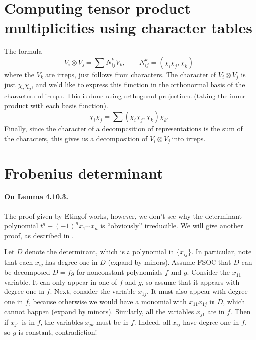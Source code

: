 \documentclass[oneside]{scrbook}
\begin{document}
\section{Computing tensor product multiplicities using character tables}
The formula
\[V_i\otimes V_j=\sum N_{ij}^kV_k, \qquad N_{ij}^{k}=(\chi_i\chi_j,\chi_k)\]
where the $V_k$ are irreps, just follows from characters. The character of $V_i\otimes V_j$ is just $\chi_i\chi_j$, and we'd like to express this function in the orthonormal basis of the characters of irreps. This is done using orthogonal projections (taking the inner product with each basis function). 
\[\chi_i\chi_j=\sum (\chi_i\chi_j,\chi_k)\chi_k.\]
Finally, since the character of a decomposition of representations is the sum of the characters, this gives us a decomposition of $V_i\otimes V_j$ into irreps.

\section{Frobenius determinant}
\paragraph{On Lemma 4.10.3.} 
The proof given by Etingof works, however, we don't see why the determinant polynomial $t^n-(-1)^nx_1\cdots x_n$ is ``obviously'' irreducible. We will give another proof, as described in \cite{147085}.

Let $D$ denote the determinant, which is a polynomial in $\{x_{ij}\}$. In particular, note that each $x_{ij}$ has degree one in $D$ (expand by minors). Assume FSOC that $D$ can be decomposed $D=fg$ for nonconstant polynomials $f$ and $g$. Consider the $x_{11}$ variable. It can only appear in one of $f$ and $g$, so assume that it appears with degree one in $f$. Next, consider the variable $x_{1j}$. It must also appear with degree one in $f$, because otherwise we would have a monomial with $x_{11}x_{1j}$ in $D$, which cannot happen (expand by minors). Similarly, all the variables $x_{j1}$ are in $f$. Then if $x_{j1}$ is in $f$, the variables $x_{jk}$ must be in $f$. Indeed, all $x_{ij}$ have degree one in $f$, so $g$ is constant, contradiction!

\end{document}
